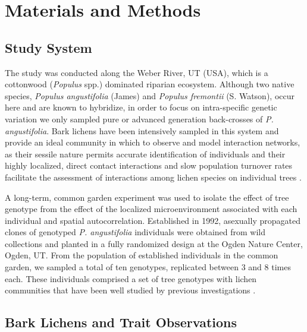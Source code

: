 \documentclass[fleqn,12pt]{olplainarticle}
\begin{document}
\section*{Materials and Methods}


\subsection*{Study System}

The study was conducted along the Weber River, UT (USA), which is a
cottonwood (\textit{Populus} spp.) dominated riparian
ecosystem. Although two native species, \textit{Populus angustifolia}
(James) and \textit{Populus fremontii} (S. Watson), occur here and are
known to hybridize, in order to focus on intra-specific genetic
variation we only sampled pure or advanced generation back-crosses of
\textit{P. angustifolia}. Bark lichens have been
intensively sampled in this system and provide an ideal community in
which to observe and model interaction networks, as their sessile
nature permits accurate identification of individuals and their highly
localized, direct contact interactions and slow population turnover
rates facilitate the assessment of interactions among lichen species
on individual trees \citep{Lamit2015a}.

A long-term, common garden experiment was used to isolate the effect
of tree genotype from the effect of the localized microenvironment
associated with each individual and spatial
autocorrelation. Established in 1992, asexually propagated clones of
genotyped \textit{P. angustifolia} individuals were obtained from wild
collections and planted in a fully randomized design at the Ogden
Nature Center, Ogden, UT. From the population of established
individuals in the common garden, we sampled a total of ten genotypes,
replicated between 3 and 8 times each. These individuals comprised a
set of tree genotypes with lichen communities that have been well
studied by previous investigations \citep{Lamit2011,
  Lamit2015a, Lamit2015c}.



\subsection*{Bark Lichens and Trait Observations}
\end{document}

